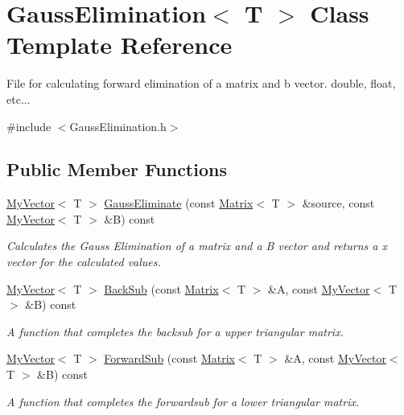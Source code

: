 \hypertarget{class_gauss_elimination}{}\section{Gauss\+Elimination$<$ T $>$ Class Template Reference}
\label{class_gauss_elimination}


File for calculating forward elimination of a matrix and b vector. double, float, etc...  




{\ttfamily \#include $<$Gauss\+Elimination.\+h$>$}

\subsection*{Public Member Functions}
\begin{DoxyCompactItemize}
\item 
\mbox{\hyperlink{class_my_vector}{My\+Vector}}$<$ T $>$ \mbox{\hyperlink{class_gauss_elimination_a393e790f3c8ab830fad14120c552326c}{Gauss\+Eliminate}} (const \mbox{\hyperlink{class_matrix}{Matrix}}$<$ T $>$ \&source, const \mbox{\hyperlink{class_my_vector}{My\+Vector}}$<$ T $>$ \&B) const
\begin{DoxyCompactList}\small\item\em Calculates the Gauss Elimination of a matrix and a B vector and returns a x vector for the calculated values. \end{DoxyCompactList}\item 
\mbox{\hyperlink{class_my_vector}{My\+Vector}}$<$ T $>$ \mbox{\hyperlink{class_gauss_elimination_a6aa34564f311767a5c7eec37306f9ca3}{Back\+Sub}} (const \mbox{\hyperlink{class_matrix}{Matrix}}$<$ T $>$ \&A, const \mbox{\hyperlink{class_my_vector}{My\+Vector}}$<$ T $>$ \&B) const
\begin{DoxyCompactList}\small\item\em A function that completes the backsub for a upper triangular matrix. \end{DoxyCompactList}\item 
\mbox{\hyperlink{class_my_vector}{My\+Vector}}$<$ T $>$ \mbox{\hyperlink{class_gauss_elimination_aa7462be41101f990e6bc1ae8e8ed2958}{Forward\+Sub}} (const \mbox{\hyperlink{class_matrix}{Matrix}}$<$ T $>$ \&A, const \mbox{\hyperlink{class_my_vector}{My\+Vector}}$<$ T $>$ \&B) const
\begin{DoxyCompactList}\small\item\em A function that completes the forwardsub for a lower triangular matrix. \end{DoxyCompactList}\end{DoxyCompactItemize}


